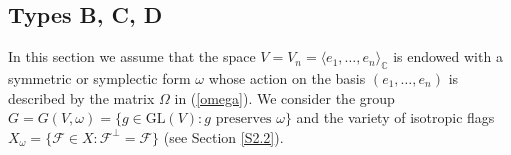 \documentclass{amsart}
\theoremstyle{definition}
\begin{document}
\subsection{Types B, C, D}

\label{S3.3}

In this section we assume that the space $V=V_n=\langle e_1,\ldots,e_n\rangle_\mathbb{C}$ is endowed with a symmetric or symplectic form $\omega$ whose action on the basis $(e_1,\ldots,e_n)$ is described by the matrix $\Omega$
in (\ref{omega}).
We consider the group $G=G(V,\omega)=\{g\in\mathrm{GL}(V):\mbox{$g$ preserves $\omega$}\}$ and the variety of isotropic flags $X_\omega=\{\mathcal{F}\in X:\mathcal{F}^\perp=\mathcal{F}\}$
(see Section \ref{S2.2}).
\end{document}
